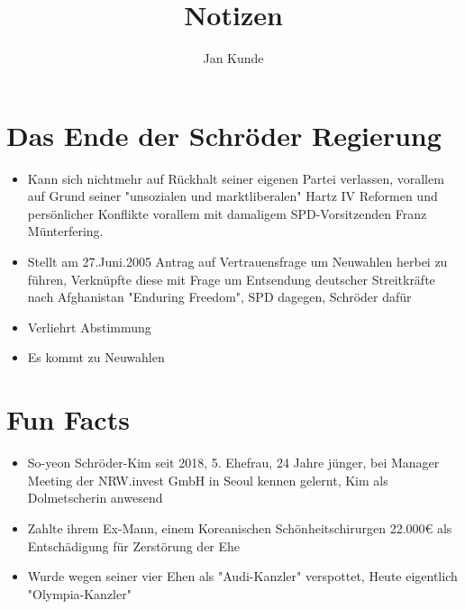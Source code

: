 \documentclass[14pt]{article}
\title{Notizen}
\author{Jan Kunde}
\date{}
\begin{document}
    \maketitle
    
    \section{Das Ende der Schröder Regierung}
        \begin{itemize}
            \item Kann sich nichtmehr auf Rückhalt seiner eigenen Partei verlassen, vorallem auf Grund seiner "unsozialen und marktliberalen" Hartz IV Reformen und 
                persönlicher Konflikte vorallem mit damaligem SPD-Vorsitzenden Franz Münterfering. 
            \item Stellt am 27.Juni.2005 Antrag auf Vertrauensfrage um Neuwahlen herbei zu führen, Verknüpfte diese mit Frage um Entsendung
                deutscher Streitkräfte nach Afghanistan "Enduring Freedom", SPD dagegen, Schröder dafür
            \item Verliehrt Abstimmung
            \item Es kommt zu Neuwahlen
        \end{itemize}

    \section{Fun Facts}
        \begin{itemize}
            \item So-yeon Schröder-Kim seit 2018, 5. Ehefrau, 24 Jahre jünger, bei Manager Meeting der NRW.invest GmbH in Seoul kennen gelernt, Kim als Dolmetscherin anwesend
            \item Zahlte ihrem Ex-Mann, einem Koreanischen Schönheitschirurgen 22.000€ als Entschädigung für Zerstörung der Ehe 
            \item Wurde wegen seiner vier Ehen als "Audi-Kanzler" verspottet, Heute eigentlich "Olympia-Kanzler"
        \end{itemize}
\end{document}

